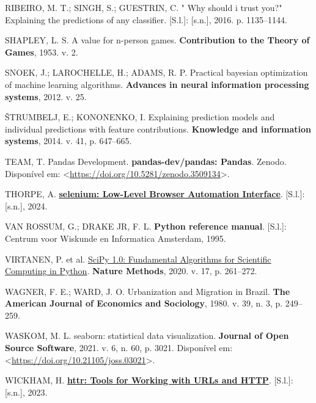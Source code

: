 \documentclass[
  12pt,
  a4paper,
]{scrreprt}
\newlength{\cslhangindent}
\newenvironment{CSLReferences}[2] %
 {\begin{list}{}{%
  \setlength{\itemindent}{0pt}
  \setlength{\leftmargin}{0pt}
  \setlength{\parsep}{0pt}
  \ifodd #1
   \setlength{\leftmargin}{\cslhangindent}
   \setlength{\itemindent}{-1\cslhangindent}
  \fi
  \setlength{\itemsep}{#2\baselineskip}}}
 {\end{list}}
\begin{document}
\begin{CSLReferences}{0}{1}
RIBEIRO, M. T.; SINGH, S.; GUESTRIN, C. " Why should i trust you?"
Explaining the predictions of any classifier. {[}S.l.{]}: {[}s.n.{]},
2016. p. 1135--1144.

SHAPLEY, L. S. A value for n-person games. \textbf{Contribution to the
Theory of Games}, 1953. v. 2.

SNOEK, J.; LAROCHELLE, H.; ADAMS, R. P. Practical bayesian optimization
of machine learning algorithms. \textbf{Advances in neural information
processing systems}, 2012. v. 25.

ŠTRUMBELJ, E.; KONONENKO, I. Explaining prediction models and individual
predictions with feature contributions. \textbf{Knowledge and
information systems}, 2014. v. 41, p. 647--665.

TEAM, T. Pandas Development. \textbf{pandas-dev/pandas: Pandas}. Zenodo.
Disponível em:
\textless{}\url{https://doi.org/10.5281/zenodo.3509134}\textgreater.

THORPE, A.
\textbf{\href{https://CRAN.R-project.org/package=selenium}{selenium:
Low-Level Browser Automation Interface}}. {[}S.l.{]}: {[}s.n.{]}, 2024.

VAN ROSSUM, G.; DRAKE JR, F. L. \textbf{Python reference manual}.
{[}S.l.{]}: Centrum voor Wiskunde en Informatica Amsterdam, 1995.

VIRTANEN, P. et al.
\href{https://doi.org/10.1038/s41592-019-0686-2}{{{SciPy} 1.0:
Fundamental Algorithms for Scientific Computing in Python}}.
\textbf{Nature Methods}, 2020. v. 17, p. 261--272.

WAGNER, F. E.; WARD, J. O. Urbanization and Migration in Brazil.
\textbf{The American Journal of Economics and Sociology}, 1980. v. 39,
n. 3, p. 249--259.

WASKOM, M. L. seaborn: statistical data visualization. \textbf{Journal
of Open Source Software}, 2021. v. 6, n. 60, p. 3021. Disponível em:
\textless{}\url{https://doi.org/10.21105/joss.03021}\textgreater.

WICKHAM, H. \textbf{\href{https://CRAN.R-project.org/package=httr}{httr:
Tools for Working with URLs and HTTP}}. {[}S.l.{]}: {[}s.n.{]}, 2023.


\end{CSLReferences}
\end{document}
